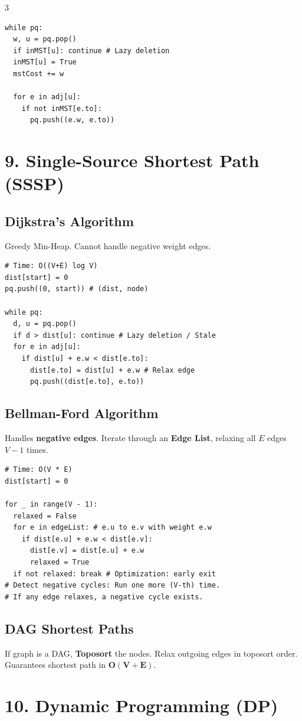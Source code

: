 \documentclass[7pt,landscape]{extarticle}
\begin{document}
\begin{multicols*}{3}
\begin{lstlisting}
while pq:
  w, u = pq.pop()
  if inMST[u]: continue # Lazy deletion
  inMST[u] = True 
  mstCost += w
  
  for e in adj[u]:
    if not inMST[e.to]: 
      pq.push((e.w, e.to))
\end{lstlisting}

\section*{9. Single-Source Shortest Path (SSSP)}
\subsection*{Dijkstra's Algorithm}
Greedy Min-Heap. Cannot handle negative weight edges.
\begin{lstlisting}
# Time: O((V+E) log V)
dist[start] = 0
pq.push((0, start)) # (dist, node)

while pq:
  d, u = pq.pop()
  if d > dist[u]: continue # Lazy deletion / Stale
  for e in adj[u]:
    if dist[u] + e.w < dist[e.to]:
      dist[e.to] = dist[u] + e.w # Relax edge
      pq.push((dist[e.to], e.to))
\end{lstlisting}

\subsection*{Bellman-Ford Algorithm}
Handles \textbf{negative edges}. Iterate through an \textbf{Edge List}, relaxing all $E$ edges $V-1$ times. 
\begin{lstlisting}
# Time: O(V * E)
dist[start] = 0

for _ in range(V - 1):
  relaxed = False
  for e in edgeList: # e.u to e.v with weight e.w
    if dist[e.u] + e.w < dist[e.v]:
      dist[e.v] = dist[e.u] + e.w
      relaxed = True
  if not relaxed: break # Optimization: early exit
# Detect negative cycles: Run one more (V-th) time. 
# If any edge relaxes, a negative cycle exists.
\end{lstlisting}

\subsection*{DAG Shortest Paths}
If graph is a DAG, \textbf{Toposort} the nodes. Relax outgoing edges in toposort order. Guarantees shortest path in $\mathbf{O(V+E)}$.

\section*{10. Dynamic Programming (DP)}



\end{multicols*}
\end{document}
